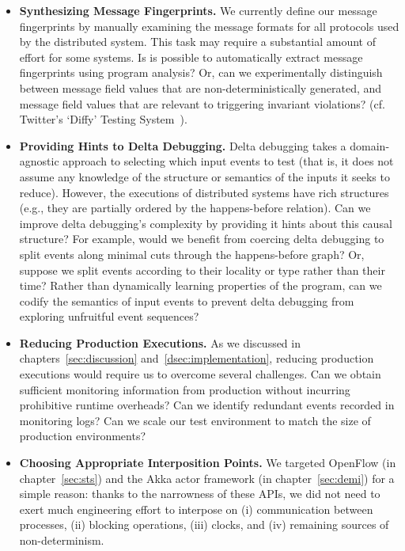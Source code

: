 \begin{itemize}
\item \textbf{Synthesizing Message Fingerprints.} We currently define our message
fingerprints by manually examining the message formats for all protocols used
by the distributed system. This task may require a substantial amount of
effort for some systems. Is is possible to automatically extract
message fingerprints using program analysis? Or, can we experimentally
distinguish between message field values that are non-deterministically
generated, and message field values that are relevant to triggering invariant
violations? (cf. Twitter's `Diffy' Testing System~\cite{diffy}).

\item \textbf{Providing Hints to Delta Debugging.} Delta debugging takes a
domain-agnostic approach to selecting which input events to
test (that is, it does not assume any knowledge of the structure or semantics
of the inputs it seeks to reduce). However, the executions of distributed systems have
rich structures (e.g., they are partially ordered by the happens-before
relation). Can we improve delta debugging's complexity by
providing it hints about this causal structure? For example, would we benefit
from coercing delta debugging to split events along minimal cuts through the
happens-before graph? Or, suppose we split events according to their locality or type rather
than their time? Rather than dynamically learning properties of the
program, can we codify the semantics of input events to prevent delta
debugging from exploring unfruitful event sequences?

\item \textbf{Reducing Production Executions.} As we discussed in
chapters~\ref{sec:discussion} and~\ref{dsec:implementation}, reducing production
executions would require us to overcome several challenges. Can we obtain
sufficient monitoring information from production without incurring
prohibitive runtime overheads? Can we identify redundant events recorded in
monitoring logs? Can we scale our test environment to match the size of production
environments?

\item \textbf{Choosing Appropriate Interposition Points.} We targeted
OpenFlow (in chapter~\ref{sec:sts}) and the Akka actor framework (in
chapter~\ref{sec:demi}) for a simple reason: thanks to the narrowness of
these APIs, we did not need to exert much
engineering effort to interpose on (i) communication
between processes, (ii) blocking operations, (iii) clocks, and (iv) remaining sources of non-determinism.


\end{itemize}
